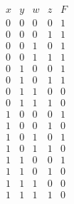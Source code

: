 \documentclass[answers]{exam}
\begin{document}
\begin{questions}
\begin{solution}
    \begin{gather*}
      \begin{array}{c|c|c|c|c}
        x & y & w & z & F \\
        \hline
        0 & 0 & 0 & 0 & 1 \\
        0 & 0 & 0 & 1 & 1 \\
        0 & 0 & 1 & 0 & 1 \\
        0 & 0 & 1 & 1 & 1 \\
        0 & 1 & 0 & 0 & 1 \\
        0 & 1 & 0 & 1 & 1 \\
        0 & 1 & 1 & 0 & 0 \\
        0 & 1 & 1 & 1 & 0 \\
        1 & 0 & 0 & 0 & 1 \\
        1 & 0 & 0 & 1 & 0 \\
        1 & 0 & 1 & 0 & 1 \\
        1 & 0 & 1 & 1 & 0 \\
        1 & 1 & 0 & 0 & 1 \\
        1 & 1 & 0 & 1 & 0 \\
        1 & 1 & 1 & 0 & 0 \\
        1 & 1 & 1 & 1 & 0 \\
      \end{array}
    \end{gather*}
  \end{solution}


\end{questions}
\end{document}
